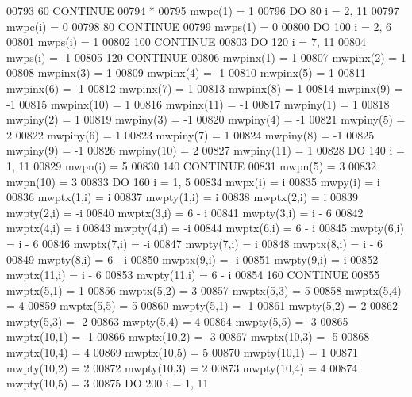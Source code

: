 \begin{DoxyCode}
00793    60 \textcolor{keywordflow}{CONTINUE}
00794 \textcolor{comment}{*}
00795       mwpc(1) = 1
00796       \textcolor{keywordflow}{DO} 80 i = 2, 11
00797          mwpc(i) = 0
00798    80 \textcolor{keywordflow}{CONTINUE}
00799       mwps(1) = 0
00800       \textcolor{keywordflow}{DO} 100 i = 2, 6
00801          mwps(i) = 1
00802   100 \textcolor{keywordflow}{CONTINUE}
00803       \textcolor{keywordflow}{DO} 120 i = 7, 11
00804          mwps(i) = -1
00805   120 \textcolor{keywordflow}{CONTINUE}
00806       mwpinx(1) = 1
00807       mwpinx(2) = 1
00808       mwpinx(3) = 1
00809       mwpinx(4) = -1
00810       mwpinx(5) = 1
00811       mwpinx(6) = -1
00812       mwpinx(7) = 1
00813       mwpinx(8) = 1
00814       mwpinx(9) = -1
00815       mwpinx(10) = 1
00816       mwpinx(11) = -1
00817       mwpiny(1) = 1
00818       mwpiny(2) = 1
00819       mwpiny(3) = -1
00820       mwpiny(4) = -1
00821       mwpiny(5) = 2
00822       mwpiny(6) = 1
00823       mwpiny(7) = 1
00824       mwpiny(8) = -1
00825       mwpiny(9) = -1
00826       mwpiny(10) = 2
00827       mwpiny(11) = 1
00828       \textcolor{keywordflow}{DO} 140 i = 1, 11
00829          mwpn(i) = 5
00830   140 \textcolor{keywordflow}{CONTINUE}
00831       mwpn(5) = 3
00832       mwpn(10) = 3
00833       \textcolor{keywordflow}{DO} 160 i = 1, 5
00834          mwpx(i) = i
00835          mwpy(i) = i
00836          mwptx(1,i) = i
00837          mwpty(1,i) = i
00838          mwptx(2,i) = i
00839          mwpty(2,i) = -i
00840          mwptx(3,i) = 6 - i
00841          mwpty(3,i) = i - 6
00842          mwptx(4,i) = i
00843          mwpty(4,i) = -i
00844          mwptx(6,i) = 6 - i
00845          mwpty(6,i) = i - 6
00846          mwptx(7,i) = -i
00847          mwpty(7,i) = i
00848          mwptx(8,i) = i - 6
00849          mwpty(8,i) = 6 - i
00850          mwptx(9,i) = -i
00851          mwpty(9,i) = i
00852          mwptx(11,i) = i - 6
00853          mwpty(11,i) = 6 - i
00854   160 \textcolor{keywordflow}{CONTINUE}
00855       mwptx(5,1) = 1
00856       mwptx(5,2) = 3
00857       mwptx(5,3) = 5
00858       mwptx(5,4) = 4
00859       mwptx(5,5) = 5
00860       mwpty(5,1) = -1
00861       mwpty(5,2) = 2
00862       mwpty(5,3) = -2
00863       mwpty(5,4) = 4
00864       mwpty(5,5) = -3
00865       mwptx(10,1) = -1
00866       mwptx(10,2) = -3
00867       mwptx(10,3) = -5
00868       mwptx(10,4) = 4
00869       mwptx(10,5) = 5
00870       mwpty(10,1) = 1
00871       mwpty(10,2) = 2
00872       mwpty(10,3) = 2
00873       mwpty(10,4) = 4
00874       mwpty(10,5) = 3
00875       \textcolor{keywordflow}{DO} 200 i = 1, 11

\end{DoxyCode}
